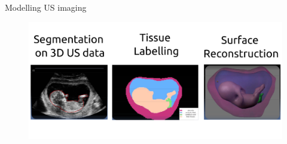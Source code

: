 

{


\begin{frame}{Modelling US imaging}
      \begin{figure}
        \centering
        \includegraphics[width=1.0\textwidth]{./figures/modelling-us-imaging/versions/drawing-v01.png}
      \end{figure}
\end{frame}
}



